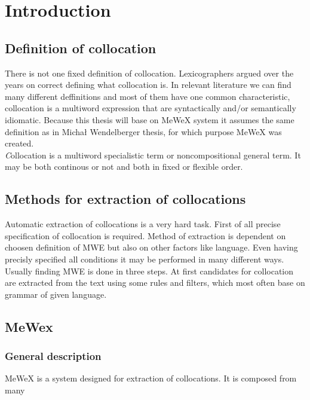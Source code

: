 
\chapter{Introduction}

\section{Definition of collocation}
There is not one fixed definition of collocation. Lexicographers argued over the years on correct defining what collocation is.
In relevant literature we can find many different deffinitions and most of them have one common characteristic, 
collocation is a multiword expression that are syntactically and/or semantically idiomatic. Because this thesis will base on MeWeX system 
it assumes the same definition as in Michał Wendelberger thesis, for which purpose MeWeX was created.
\\ \textit Collocation is a multiword specialistic term or noncompositional general term. It may be both continous or not and both in fixed or flexible order.

\section{Methods for extraction of collocations}
Automatic extraction of collocations is a very hard task. First of all precise specification of collocation is required.
Method of extraction is dependent on choosen definition of MWE but also on other factors like language. 
Even having precisly specified all conditions it may be performed in many different ways. 
Usually finding MWE is done in three steps. At first candidates for collocation are extracted from the text using some rules and filters, 
which most often base on grammar of given language.

\section{MeWex}

\subsection{General description}
MeWeX is a system designed for extraction of collocations. It is composed from many


